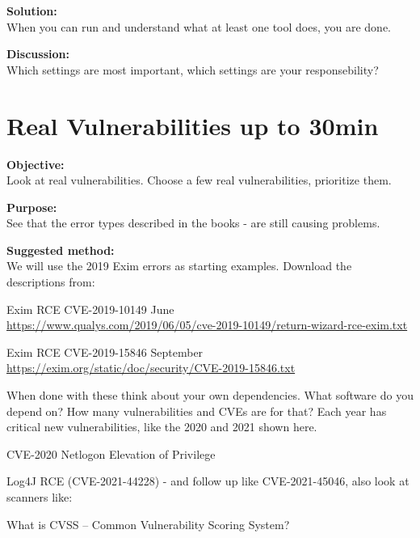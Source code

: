 \documentclass[a4paper,11pt,notitlepage]{report}
\begin{document}
{\bf Solution:}\\
When you can run and understand what at least one tool does, you are done.

{\bf Discussion:}\\
Which settings are most important, which settings are your responsebility?



\chapter{Real Vulnerabilities up to 30min}
\label{ex:real-vulns-exim}

{\bf Objective:}\\
Look at real vulnerabilities. Choose a few real vulnerabilities, prioritize them.

{\bf Purpose:}\\
See that the error types described in the books - are still causing problems.

{\bf Suggested method:}\\
We will use the 2019 Exim errors as starting examples. Download the descriptions from:
\begin{list2}
\item Exim RCE CVE-2019-10149 June\\ \url{https://www.qualys.com/2019/06/05/cve-2019-10149/return-wizard-rce-exim.txt}

\item Exim RCE CVE-2019-15846 September\\
\url{https://exim.org/static/doc/security/CVE-2019-15846.txt}
\end{list2}

When done with these think about your own dependencies. What software do you depend on? How many vulnerabilities and CVEs are for that? Each year has critical new vulnerabilities, like the 2020 and 2021 shown here.

\begin{list2}
\item CVE-2020 Netlogon Elevation of Privilege \\
\item Log4J RCE (CVE-2021-44228) - and follow up like CVE-2021-45046, also look at scanners like:\\
\end{list2}

What is CVSS -- Common Vulnerability Scoring System?
\end{document}
